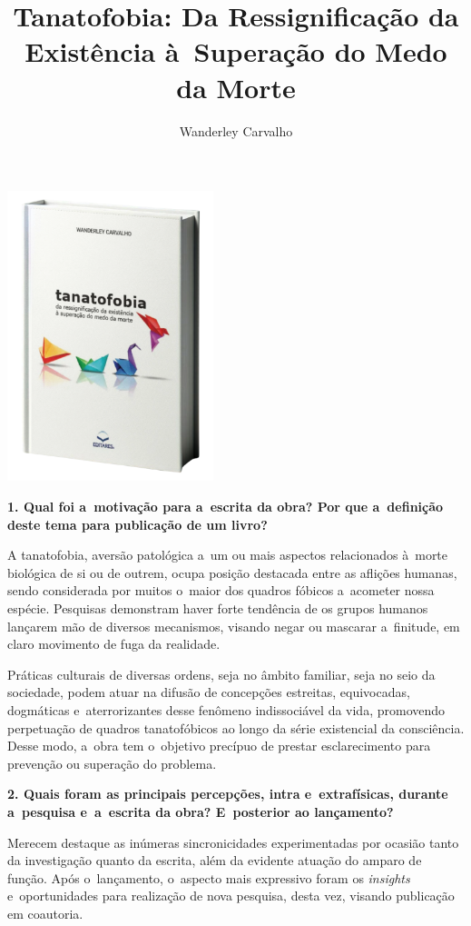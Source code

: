 \documentclass{gescons}
\author{Wanderley Carvalho}
\title{Tanatofobia: Da Ressignificação da Existência à~Superação do Medo da Morte}
\begin{document}
    \makeentrevistatitle

    \begin{multicols}{2}

\begin{center}
    \vspace{-0.5cm}
    \includegraphics[width=6cm]{articles/entrevista/mockups/Wanderley_Carvalho}
\end{center}


\textbf{1. Qual foi a~motivação para a~escrita da obra? Por que a~definição deste tema para publicação de um livro?}


A tanatofobia, aversão patológica a~um ou mais aspectos relacionados à~morte biológica de si ou de outrem, ocupa posição destacada entre as aflições humanas, sendo considerada por muitos o~maior dos quadros fóbicos a~acometer nossa espécie. Pesquisas demonstram haver forte tendência de os grupos humanos lançarem mão de diversos mecanismos, visando negar ou mascarar a~finitude, em claro movimento de fuga da realidade.

Práticas culturais de diversas ordens, seja no âmbito familiar, seja no seio da sociedade, podem atuar na difusão de concepções estreitas, equivocadas, dogmáticas e~aterrorizantes desse fenômeno indissociável da vida, promovendo perpetuação de quadros tanatofóbicos ao longo da série existencial da consciência. Desse modo, a~obra tem o~objetivo precípuo de prestar esclarecimento para prevenção ou superação do problema.

\textbf{2. Quais foram as principais percepções, intra e~extrafísicas, durante a~pesquisa e~a~escrita da obra? E~posterior ao lançamento?}

Merecem destaque as inúmeras sincronicidades experimentadas por ocasião tanto da investigação quanto da escrita, além da evidente atuação do amparo de função. Após o~lançamento, o~aspecto mais expressivo foram os \emph{insights} e~oportunidades para realização de nova pesquisa, desta vez, visando publicação em coautoria.


\end{multicols}
\end{document}
